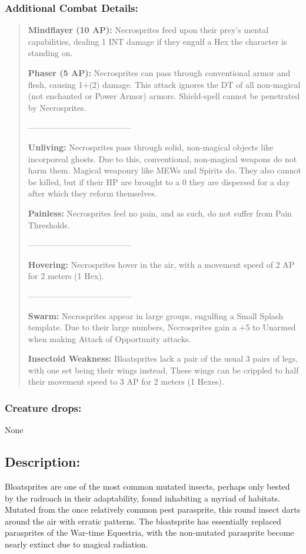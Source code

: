 \documentclass[11pt,a4paper,twocolumn]{book}
\begin{document}
	\subsubsection*{Additional Combat Details:}
	\begin{verse}
		\textbf{Mindflayer (10 AP):} Necrosprites feed upon their prey's mental capabilities, dealing 1 INT damage if they engulf a Hex the character is standing on.
		
		\textbf{Phaser (5 AP):} Necrosprites can pass through conventional armor and flesh, causing 1+(2) damage. This attack ignores the DT of all non-magical (not enchanted or Power Armor) armors. Shield-spell cannot be penetrated by Necrosprites.
		
		--------------------------------------
		
		\textbf{Unliving:} Necrosprites pass through solid, non-magical objects like incorporeal ghosts. Due to this, conventional, non-magical weapons do not harm them. Magical weaponry like MEWs and Spirits do. They also cannot be killed, but if their HP are brought to a 0 they are dispersed for a day after which they reform themselves.
		
		\textbf{Painless: }Necrosprites feel no pain, and as such, do not suffer from Pain Thresholds.
		
		--------------------------------------
		
		\textbf{Hovering:} Necrosprites hover in the air, with a movement speed of 2 AP for 2 meters (1 Hex).
		
		--------------------------------------
		
		\textbf{Swarm: }Necrosprites appear in large groups, engulfing a Small Splash template. Due to their large numbers, Necrosprites gain a +5 to Unarmed when making Attack of Opportunity attacks. 
		
		\textbf{Insectoid Weakness:} Bloatsprites lack a pair of the usual 3 pairs of legs, with one set being their wings instead. These wings can be crippled to half their movement speed to 3 AP for 2 meters (1 Hexes).
		
	\end{verse}
	
	\subsubsection*{Creature drops:}
	None
	
	\subsection*{Description:}
	Bloatsprites are one of the most common mutated insects, perhaps only bested by the radroach in their adaptability, found inhabiting a myriad of habitats. Mutated from the once relatively common pest parasprite, this round insect darts around the air with erratic patterns. The bloatsprite has essentially replaced parasprites of the War-time Equestria, with the non-mutated parasprite become nearly extinct due to magical radiation. 
	
\end{document}
